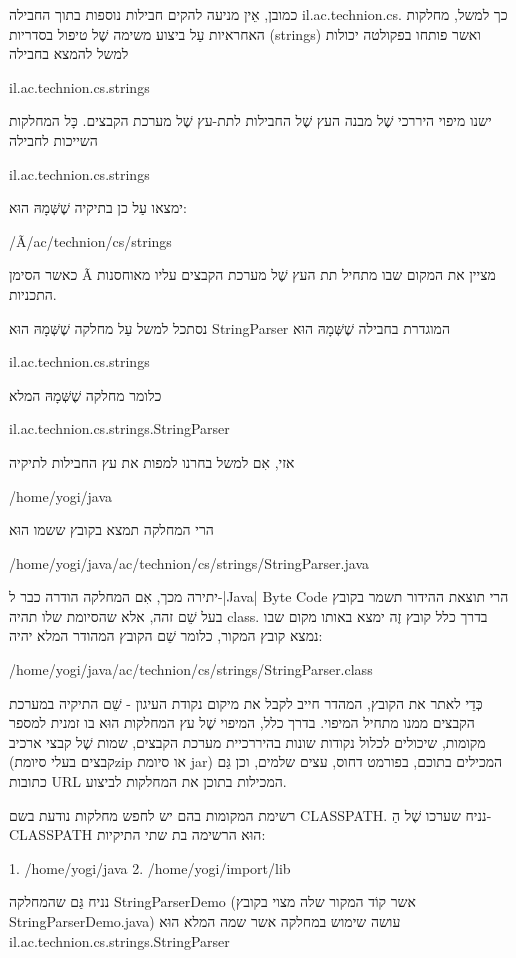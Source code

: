 כמובן, אֵין מניעה להקים חבילות נוספות בתוך החבילה il.ac.technion.cs. כך למשל,
מחלקות האחראיות עַל ביצוע משימה שֶׁל טיפול בסדריות (strings) ואשר פותחו בפקולטה
יכולות למשל להמצא בחבילה

il.ac.technion.cs.strings

ישנו מיפוי היררכי שֶׁל מבנה העץ שֶׁל החבילות לתת-עץ שֶׁל מערכת הקבצים. כָּל
המחלקות השייכות לחבילה

 il.ac.technion.cs.strings

ימצאו עַל כן בתיקיה שֶׁשְּׁמָהּ הוּא:

/Ã/ac/technion/cs/strings

כאשר הסימן Ã מציין את המקום שבו מתחיל תת העץ שֶׁל מערכת הקבצים עליו מאוחסנות
התכניות.

נסתכל למשל עַל מחלקה שֶׁשְּׁמָהּ הוּא StringParser המוגדרת בחבילה
שֶׁשְּׁמָהּ הוּא

 il.ac.technion.cs.strings

כלומר מחלקה שֶׁשְּׁמָהּ המלא

il.ac.technion.cs.strings.StringParser

אזי, אִם למשל בחרנו למפות את עץ החבילות לתיקיה

 /home/yogi/java

הרי המחלקה תמצא בקובץ ששמו הוּא

/home/yogi/java/ac/technion/cs/strings/StringParser.java

יתירה מכך, אִם המחלקה הודרה כבר ל-|Java| Byte Code הרי תוצאת ההידור תשמר
בקובץ בעל שֵׁם זהה, אלא שהסיומת שלו תהיה class. בדרך כלל קובץ זֶה ימצא באותו
מקום שבו נמצא קובץ המקור, כלומר שֵׁם הקובץ המהודר המלא יהיה:

/home/yogi/java/ac/technion/cs/strings/StringParser.class

כְּדֵי לאתר את הקובץ, המהדר חייב לקבל את מיקום נקודת העיגון - שֵׁם
התיקיה במערכת הקבצים ממנו מתחיל המיפוי. בדרך כלל, המיפוי שֶׁל עץ המחלקות
הוּא בו זמנית למספר מקומות, שיכולים לכלול נקודות שונות בהיררכיית מערכת הקבצים,
שמות שֶׁל קבצי ארכיב (קבצים בעלי סיומתzip או סיומת jar) המכילים בתוכם, בפורמט
דחוס, עצים שלמים, וכן גַּם כתובות URL המכילות בתוכן את המחלקות לביצוע.

רשימת המקומות בהם יש לחפש מחלקות נודעת בשם CLASSPATH. נניח שערכו שֶׁל
הַ-CLASSPATH הוּא הרשימה בת שתי התיקיות:

1. /home/yogi/java
2. /home/yogi/import/lib

נניח גַּם שהמחלקה StringParserDemo (אשר קוֹד המקור שלה מצוי בקובץ
StringParserDemo.java) עושה שימוש במחלקה אשר שמה המלא הוּא
il.ac.technion.cs.strings.StringParser

